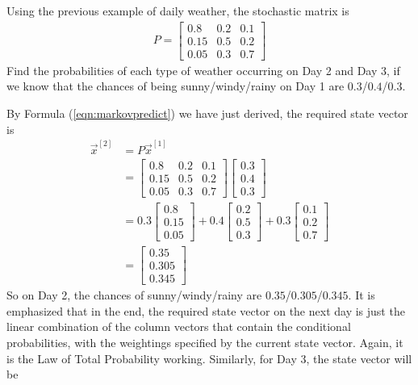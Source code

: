 \begin{exmp}
\label{exmp:weathermarkov}
Using the previous example of daily weather, the stochastic matrix is
\begin{align*}
P = 
\begin{bmatrix}
0.8 & 0.2 & 0.1\\
0.15 & 0.5 & 0.2 \\
0.05 & 0.3 & 0.7
\end{bmatrix}   
\end{align*}
Find the probabilities of each type of weather occurring on Day 2 and Day 3, if we know that the chances of being sunny/windy/rainy on Day 1 are $0.3$/$0.4$/$0.3$. 
\end{exmp}
\begin{solution}
By Formula (\ref{eqn:markovpredict}) we have just derived, the required state vector is
\begin{align*}
\vec{x}^{[2]} &= P\vec{x}^{[1]} \\
&=
\begin{bmatrix}
0.8 & 0.2 & 0.1\\
0.15 & 0.5 & 0.2 \\
0.05 & 0.3 & 0.7
\end{bmatrix}   
\begin{bmatrix}
0.3 \\
0.4 \\
0.3
\end{bmatrix} \\
&= 0.3
\begin{bmatrix}
0.8 \\
0.15 \\
0.05
\end{bmatrix}
+ 0.4
\begin{bmatrix}
0.2 \\
0.5 \\
0.3
\end{bmatrix}
+ 0.3
\begin{bmatrix}
0.1 \\
0.2 \\
0.7
\end{bmatrix} \\
&=
\begin{bmatrix}
0.35 \\
0.305 \\
0.345
\end{bmatrix}
\end{align*}
So on Day 2, the chances of sunny/windy/rainy are $0.35$/$0.305$/$0.345$. It is emphasized that in the end, the required state vector on the next day is just the linear combination of the column vectors that contain the conditional probabilities, with the weightings specified by the current state vector. Again, it is the Law of Total Probability working. Similarly, for Day 3, the state vector will be

\end{solution}
